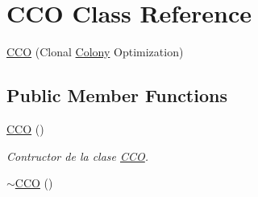 \hypertarget{class_c_c_o}{\section{C\+C\+O Class Reference}
\label{class_c_c_o}
}


\hyperlink{class_c_c_o}{C\+C\+O} (Clonal \hyperlink{class_colony}{Colony} Optimization)  


\subsection*{Public Member Functions}
\begin{DoxyCompactItemize}
\item 
\hypertarget{class_c_c_o_a48251cd1f851d236c4aec73c82b39682}{\hyperlink{class_c_c_o_a48251cd1f851d236c4aec73c82b39682}{C\+C\+O} ()}\label{class_c_c_o_a48251cd1f851d236c4aec73c82b39682}

\begin{DoxyCompactList}\small\item\em Contructor de la clase \hyperlink{class_c_c_o}{C\+C\+O}. \end{DoxyCompactList}\item 
\hypertarget{class_c_c_o_adaa4d2a9fefa24dfcd6eb8f367f60cf6}{\hyperlink{class_c_c_o_adaa4d2a9fefa24dfcd6eb8f367f60cf6}{$\sim$\+C\+C\+O} ()}\label{class_c_c_o_adaa4d2a9fefa24dfcd6eb8f367f60cf6}


\end{DoxyCompactItemize}
